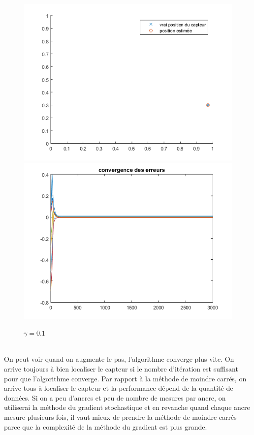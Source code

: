 \documentclass{article}
\begin{document}
\begin{figure}[!h]
\includegraphics[scale=0.35]{grad_gamma01.png} \includegraphics[scale=0.35]{grad_err_gamma01.png} 
\caption{$\gamma=0.1$}
\end{figure} 
\\On peut voir quand on augmente le pas, l'algorithme converge plus vite. On arrive toujours \`a bien localiser le capteur si le nombre d'it\'eration est suffisant pour que l'algorithme converge. Par rapport \`a la m\'ethode de moindre carr\'es, on arrive tous \`a localiser le capteur et la performance d\'epend de la quantit\'e de donn\'ees. Si on a peu d'ancres et peu de nombre de mesures par ancre, on utiliserai la m\'ethode du gradient stochastique et en revanche quand chaque ancre mesure plusieurs fois, il vaut mieux de prendre la m\'ethode de moindre carr\'es parce que la complexit\'e de la m\'ethode du gradient est plus grande.
\\
\end{document}

